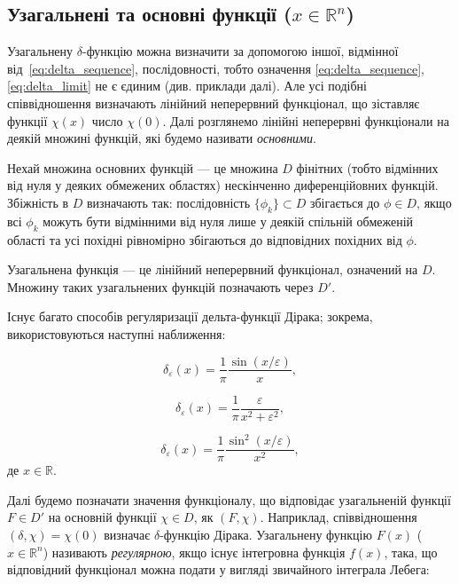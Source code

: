 \subsection{Узагальнені та основні функції (\texorpdfstring{\( x \in \mathbb{R}^n \)}{x ∈ Rⁿ})}

Узагальнену \(\delta\)-функцію можна визначити за допомогою іншої, відмінної від~\eqref{eq:delta_sequence}, послідовності, тобто означення
\eqref{eq:delta_sequence}, \eqref{eq:delta_limit} не є єдиним (див. приклади далі). Але усі подібні співвідношення визначають лінійний неперервний
функціонал, що зіставляє функції \( \chi(x) \) число \( \chi(0) \). Далі розглянемо лінійні неперервні функціонали на деякій множині функцій, які будемо
називати \textit{основними}.

Нехай множина основних функцій --- це множина \( D \) фінітних (тобто відмінних від нуля у деяких обмежених областях) нескінченно диференційовних
функцій. Збіжність в \( D \) визначають так: послідовність \( \{\phi_k\} \subset D \) збігається до \( \phi \in D \), якщо всі \( \phi_k \) можуть бути
відмінними від нуля лише у деякій спільній обмеженій області та усі похідні рівномірно збігаються до відповідних похідних від \( \phi \).

Узагальнена функція --- це лінійний неперервний функціонал, означений на \( D \). Множину таких узагальнених функцій позначають через \( D' \).

Існує багато способів регуляризації дельта-функції Дірака; зокрема, використовуються наступні наближення:

\begin{equation}
    \delta_{\varepsilon}(x) = \frac{1}{\pi} \frac{\sin(x/\varepsilon)}{x},
\label{eq:delta_sin}
\end{equation}

\begin{equation}
    \delta_{\varepsilon}(x) = \frac{1}{\pi} \frac{\varepsilon}{x^2 + \varepsilon^2},
\label{eq:delta_lorentz}
\end{equation}

\begin{equation}
    \delta_{\varepsilon}(x) = \frac{1}{\pi} \frac{\sin^2(x/\varepsilon)}{x^2},
\label{eq:delta_sin2}
\end{equation}
де \( x \in \mathbb{R} \).

Далі будемо позначати значення функціоналу, що відповідає узагальненій функції \( F \in D' \) на основній функції \( \chi \in D \), як \( (F, \chi) \).
Наприклад, співвідношення \( (\delta, \chi) = \chi(0) \) визначає \(\delta\)-функцію Дірака. Узагальнену функцію \( F(x) \) (\( x \in \mathbb{R}^n \))
називають \textit{регулярною}, якщо існує інтегровна функція \( f(x) \), така, що відповідний функціонал можна подати у вигляді звичайного інтеграла
Лебега:

